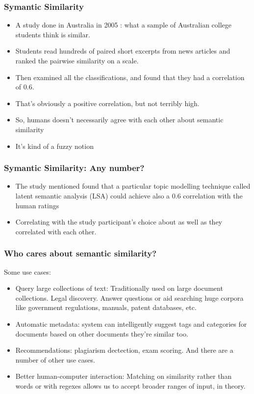 \begin{frame}[fragile]\frametitle{Symantic Similarity}
  \begin{itemize}
  	\item A study done in Australia in 2005 : what a sample of Australian college students think is similar. 
	\item Students read hundreds of paired short excerpts from news articles and ranked the pairwise similarity on a scale. 	
	\item Then examined all the classifications, and found that they had a correlation of 0.6. 
	\item That's obviously a positive correlation, but not terribly high. 
	\item So, humans doesn't necessarily agree with each other about semantic similarity
	\item It's kind of a fuzzy notion
  \end{itemize}
\end{frame}

\begin{frame}[fragile]\frametitle{Symantic Similarity: Any number?}
  \begin{itemize}
  	\item The study mentioned found that a particular topic modelling technique called latent semantic analysis (LSA) could achieve also a 0.6 correlation with the human ratings
	\item Correlating with the study participant's choice about as well as they correlated with each other.
  \end{itemize}
\end{frame}

\begin{frame}[fragile]\frametitle{Who cares about semantic similarity? }
Some use cases:

  \begin{itemize}
  	\item Query large collections of text: Traditionally used on large document collections. Legal discovery. Answer questions or aid searching huge corpora like government regulations, manuals, patent databases, etc.

  	\item  Automatic metadata: system can intelligently suggest tags and categories for documents based on other documents they're similar too. 
  	\item  Recommendations: plagiarism dectection, exam scoring. And there are a number of other use cases. 
  	\item  Better human-computer interaction: Matching on similarity rather than words or with regexes allows us to accept broader ranges of input, in theory. 

  \end{itemize}
\end{frame}

